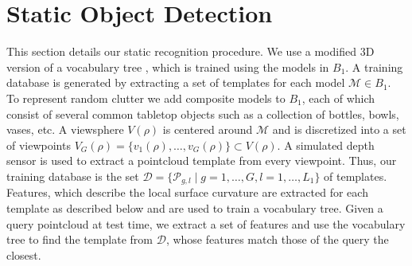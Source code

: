 \section{Static Object Detection}
\label{sec:obj_detect}


This section details our static recognition procedure. We use a modified 3D version of a vocabulary tree \cite{NisterS06_vocabtree}, which is trained using the models in $B_1$. A training database is generated by extracting a set of templates for each model $\mathcal{M} \in B_1$. To represent random clutter we add composite models to $B_1$, each of which consist of several common tabletop objects such as a collection of bottles, bowls, vases, etc. A viewsphere $V(\rho)$ is centered around $\mathcal{M}$ and is discretized into a set of viewpoints $V_G(\rho) = \{v_1(\rho),\ldots, v_G(\rho)\} \subset V(\rho)$. A simulated depth sensor is used to extract a pointcloud template from every viewpoint. Thus, our training database is the set $\mathcal{D} = \{\mathcal{P}_{g,l} \mid g = 1,\ldots, G, l = 1,\ldots,L_1\}$ of templates. Features, which describe the local surface curvature are extracted for each template as described below and are used to train a vocabulary tree. Given a query pointcloud at test time, we 
extract a set of features and use the vocabulary tree to find the template from $\mathcal{D}$, whose features match those of the query the closest.


